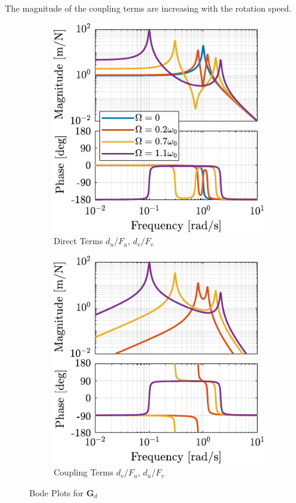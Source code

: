 \documentclass{ISMA_USD2020}
\begin{document}
The magnitude of the coupling terms are increasing with the rotation speed.

\begin{figure}[htbp]
\begin{subfigure}[c]{0.45\linewidth}
\includegraphics[width=\linewidth]{figs/plant_compare_rotating_speed_direct.pdf}
\caption{\label{fig:plant_compare_rotating_speed_direct} Direct Terms \(d_u/F_u\), \(d_v/F_v\)}
\end{subfigure}
\begin{subfigure}[c]{0.45\linewidth}
\includegraphics[width=\linewidth]{figs/plant_compare_rotating_speed_coupling.pdf}
\caption{\label{fig:plant_compare_rotating_speed_coupling} Coupling Terms \(d_v/F_u\), \(d_u/F_v\)}
\end{subfigure}
\caption{\label{fig:plant_compare_rotating_speed}Bode Plots for \(\bm{G}_d\)}
\centering
\end{figure}
\end{document}

